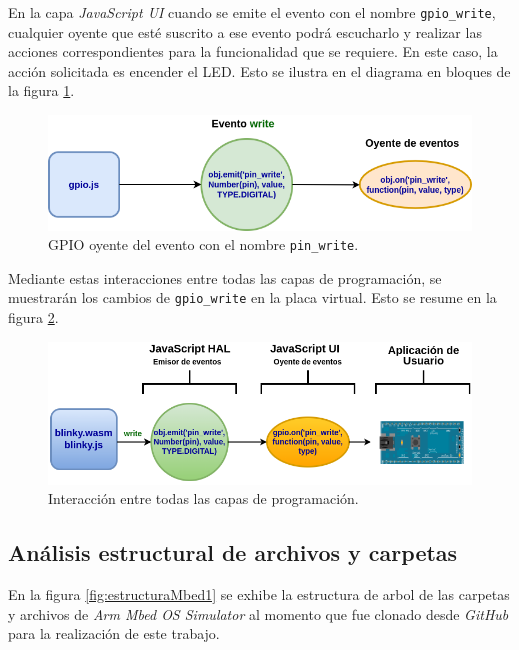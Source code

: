 En la capa \textit{JavaScript UI} cuando se emite el evento con el nombre \texttt{gpio\_write}, cualquier oyente que esté suscrito a ese evento podrá escucharlo y realizar las acciones correspondientes para la funcionalidad que se requiere. En este caso, la acción solicitada es encender el LED. Esto se ilustra en el diagrama en bloques de la figura \ref{fig:ListeningGPIOEventEmitter}.

\begin{figure}[ht]
	\centering
	\includegraphics[scale=.50]{./Figures/ListeningGPIOEventEmitter.png}
	\caption{GPIO oyente del evento con el nombre \texttt{pin\_write}.}
	\label{fig:ListeningGPIOEventEmitter}
\end{figure}

Mediante estas interacciones entre todas las capas de programación, se muestrarán los cambios de \texttt{gpio\_write} en la placa virtual. Esto se resume en la figura \ref{fig:AplicacionUsuarioLeds}.

\begin{figure}[ht]
	\centering
	\includegraphics[scale=.62]{./Figures/AplicacionUsuarioLeds.png}
	\caption{Interacción entre todas las capas de programación.}
	\label{fig:AplicacionUsuarioLeds}
\end{figure}

\subsection{Análisis estructural de archivos y carpetas}

En la figura \ref{fig:estructuraMbed1} se exhibe la estructura de arbol de las carpetas y archivos de \textit{Arm Mbed OS Simulator} al momento que fue clonado desde \textit{GitHub} para la realización de este trabajo.

